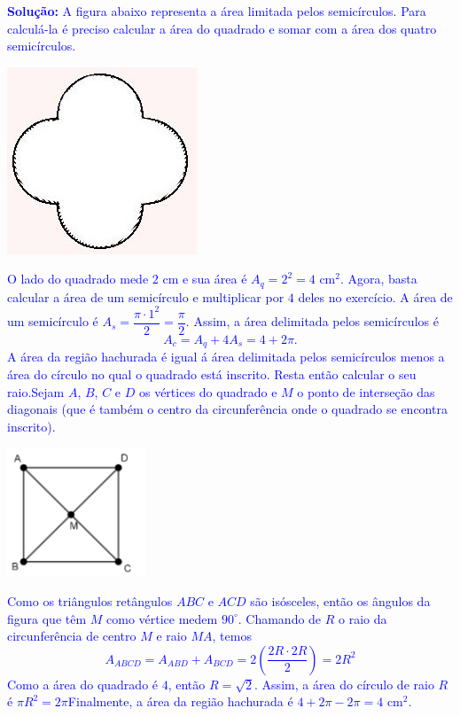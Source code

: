 \documentclass[oneside,a4paper,12pt]{article}
\theoremstyle{Colorido}
\theoremstyle{solu}
\theoremstyle{dotlessP}
\newcommand{\solucao}[1]{\textcolor{blue}{\textbf{Solução:} #1}}
\begin{document}
\solucao{A figura abaixo representa a área limitada pelos semicírculos. Para calculá-la é preciso calcular a área do quadrado e somar com a área dos quatro semicírculos.}
\begin{center}
\includegraphics[scale=1.0]{Provas e Avaliações/Figuras avaliações/17avaliacaociclo3.png}
\end{center}
\textcolor{blue}{O lado do quadrado mede $2\mbox{ cm}$ e sua área é $A_q=2^2=4\mbox{ cm}^2$. Agora, basta calcular a área de um semicírculo e multiplicar por $4$ deles no exercício. A área de um semicírculo é $A_s=\dfrac{\pi\cdot1^2}{2}=\dfrac{\pi}{2}$. Assim, a área delimitada pelos semicírculos é \[A_c=A_q+4A_s=4+2\pi.\]A área da região hachurada é igual á área delimitada pelos semicírculos menos a área do círculo no qual o quadrado está inscrito. Resta então calcular o seu raio.\newline \newline Sejam $A$, $B$, $C$ e $D$ os vértices do quadrado e $M$ o ponto de interseção das diagonais (que é também o centro da circunferência onde o quadrado se encontra inscrito).}
\begin{center}
\includegraphics[scale=4]{Provas e Avaliações/Figuras avaliações/18avaliacaociclo3.png}
\end{center}
\textcolor{blue}{Como os triângulos retângulos $ABC$ e $ACD$ são isósceles, então os ângulos da figura que têm $M$ como vértice medem $90^\circ$. Chamando de $R$ o raio da circunferência de centro $M$ e raio $MA$, temos \[A_{ABCD}=A_{ABD}+A_{BCD}= 2 \left( \dfrac{2R \cdot 2R}{2} \right) = 2R^2\]Como a área do quadrado é $4$, então $R=\sqrt2$. Assim, a área do círculo de raio $R$ é $\pi R^2=2\pi$\newline \newline Finalmente, a área da região hachurada é $4+2\pi-2\pi=4\mbox{ cm}^2$.}
\end{document}
